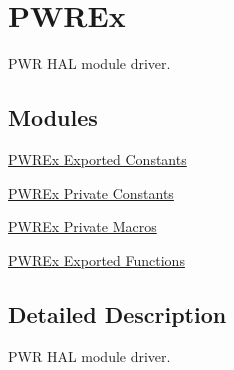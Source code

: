 \hypertarget{group___p_w_r_ex}{}\section{P\+W\+R\+Ex}
\label{group___p_w_r_ex}


P\+WR H\+AL module driver.  


\subsection*{Modules}
\begin{DoxyCompactItemize}
\item 
\hyperlink{group___p_w_r_ex___exported___constants}{P\+W\+R\+Ex Exported Constants}
\item 
\hyperlink{group___p_w_r_ex___private___constants}{P\+W\+R\+Ex Private Constants}
\item 
\hyperlink{group___p_w_r_ex___private___macros}{P\+W\+R\+Ex Private Macros}
\item 
\hyperlink{group___p_w_r_ex___exported___functions}{P\+W\+R\+Ex Exported Functions}
\end{DoxyCompactItemize}


\subsection{Detailed Description}
P\+WR H\+AL module driver. 

